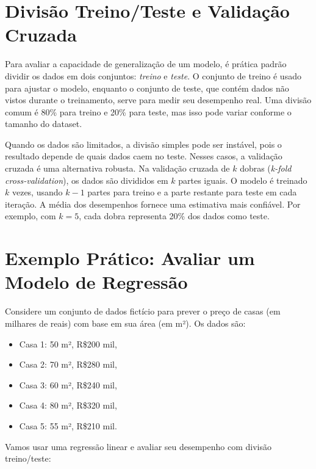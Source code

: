 \documentclass[a4paper,12pt,openany]{book}
\begin{document}
\section{Divisão Treino/Teste e Validação Cruzada}

Para avaliar a capacidade de generalização de um modelo, é prática padrão dividir os dados em dois conjuntos: \textit{treino} e \textit{teste}. O conjunto de treino é usado para ajustar o modelo, enquanto o conjunto de teste, que contém dados não vistos durante o treinamento, serve para medir seu desempenho real. Uma divisão comum é 80\% para treino e 20\% para teste, mas isso pode variar conforme o tamanho do dataset.

Quando os dados são limitados, a divisão simples pode ser instável, pois o resultado depende de quais dados caem no teste. Nesses casos, a validação cruzada é uma alternativa robusta. Na validação cruzada de \(k\) dobras (\textit{k-fold cross-validation}), os dados são divididos em \(k\) partes iguais. O modelo é treinado \(k\) vezes, usando \(k-1\) partes para treino e a parte restante para teste em cada iteração. A média dos desempenhos fornece uma estimativa mais confiável. Por exemplo, com \(k=5\), cada dobra representa 20\% dos dados como teste.

\section{Exemplo Prático: Avaliar um Modelo de Regressão}

Considere um conjunto de dados fictício para prever o preço de casas (em milhares de reais) com base em sua área (em m²). Os dados são:
\begin{itemize}
    \item Casa 1: 50 m², R\$200 mil,
    \item Casa 2: 70 m², R\$280 mil,
    \item Casa 3: 60 m², R\$240 mil,
    \item Casa 4: 80 m², R\$320 mil,
    \item Casa 5: 55 m², R\$210 mil.
\end{itemize}

Vamos usar uma regressão linear e avaliar seu desempenho com divisão treino/teste:
\end{document}
